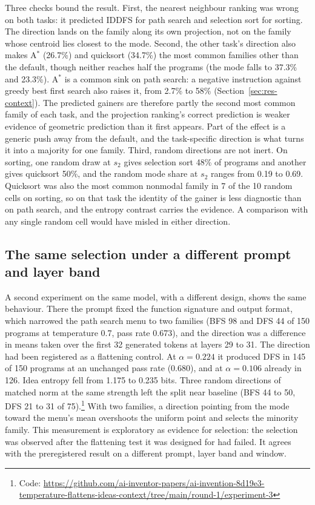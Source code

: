 \documentclass[11pt,letterpaper]{article}
\newcommand{\Astar}{A$^{*}$}
\begin{document}
Three checks bound the result. First, the nearest neighbour ranking was wrong on both tasks: it predicted IDDFS for path search and selection sort for sorting. The direction lands on the family along its own projection, not on the family whose centroid lies closest to the mode. Second, the other task's direction also makes \Astar{} (26.7\%) and quicksort (34.7\%) the most common families other than the default, though neither reaches half the programs (the mode falls to 37.3\% and 23.3\%). \Astar{} is a common sink on path search: a negative instruction against greedy best first search also raises it, from 2.7\% to 58\% (Section~\ref{sec:res-context}). The predicted gainers are therefore partly the second most common family of each task, and the projection ranking's correct prediction is weaker evidence of geometric prediction than it first appears. Part of the effect is a generic push away from the default, and the task-specific direction is what turns it into a majority for one family. Third, random directions are not inert. On sorting, one random draw at $s_2$ gives selection sort 48\% of programs and another gives quicksort 50\%, and the random mode share at $s_2$ ranges from 0.19 to 0.69. Quicksort was also the most common nonmodal family in 7 of the 10 random cells on sorting, so on that task the identity of the gainer is less diagnostic than on path search, and the entropy contrast carries the evidence. A comparison with any single random cell would have misled in either direction.

\subsection{The same selection under a different prompt and layer band}
\label{sec:res-twofam}

A second experiment on the same model, with a different design, shows the same behaviour. There the prompt fixed the function signature and output format, which narrowed the path search menu to two families (BFS 98 and DFS 44 of 150 programs at temperature 0.7, pass rate 0.673), and the direction was a difference in means taken over the first 32 generated tokens at layers 29 to 31. The direction had been registered as a flattening control. At $\alpha = 0.224$ it produced DFS in 145 of 150 programs at an unchanged pass rate (0.680), and at $\alpha = 0.106$ already in 126. Idea entropy fell from 1.175 to 0.235 bits. Three random directions of matched norm at the same strength left the split near baseline (BFS 44 to 50, DFS 21 to 31 of 75).\footnote{Code: \url{https://github.com/ai-inventor-papers/ai-invention-8d19e3-temperature-flattens-ideas-context/tree/main/round-1/experiment-3}} With two families, a direction pointing from the mode toward the menu's mean overshoots the uniform point and selects the minority family. This measurement is exploratory as evidence for selection: the selection was observed after the flattening test it was designed for had failed. It agrees with the preregistered result on a different prompt, layer band and window.
\end{document}
